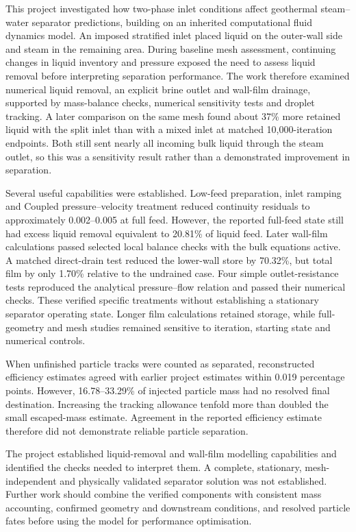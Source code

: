 This project investigated how two-phase inlet conditions affect geothermal steam--water separator predictions, building on an inherited computational fluid dynamics model. An imposed stratified inlet placed liquid on the outer-wall side and steam in the remaining area. During baseline mesh assessment, continuing changes in liquid inventory and pressure exposed the need to assess liquid removal before interpreting separation performance. The work therefore examined numerical liquid removal, an explicit brine outlet and wall-film drainage, supported by mass-balance checks, numerical sensitivity tests and droplet tracking. A later comparison on the same mesh found about 37\% more retained liquid with the split inlet than with a mixed inlet at matched 10,000-iteration endpoints. Both still sent nearly all incoming bulk liquid through the steam outlet, so this was a sensitivity result rather than a demonstrated improvement in separation.

Several useful capabilities were established. Low-feed preparation, inlet ramping and Coupled pressure--velocity treatment reduced continuity residuals to approximately 0.002--0.005 at full feed. However, the reported full-feed state still had excess liquid removal equivalent to 20.81\% of liquid feed. Later wall-film calculations passed selected local balance checks with the bulk equations active. A matched direct-drain test reduced the lower-wall store by 70.32\%, but total film by only 1.70\% relative to the undrained case. Four simple outlet-resistance tests reproduced the analytical pressure--flow relation and passed their numerical checks. These verified specific treatments without establishing a stationary separator operating state. Longer film calculations retained storage, while full-geometry and mesh studies remained sensitive to iteration, starting state and numerical controls.

When unfinished particle tracks were counted as separated, reconstructed efficiency estimates agreed with earlier project estimates within 0.019 percentage points. However, 16.78--33.29\% of injected particle mass had no resolved final destination. Increasing the tracking allowance tenfold more than doubled the small escaped-mass estimate. Agreement in the reported efficiency estimate therefore did not demonstrate reliable particle separation.

The project established liquid-removal and wall-film modelling capabilities and identified the checks needed to interpret them. A complete, stationary, mesh-independent and physically validated separator solution was not established. Further work should combine the verified components with consistent mass accounting, confirmed geometry and downstream conditions, and resolved particle fates before using the model for performance optimisation.
